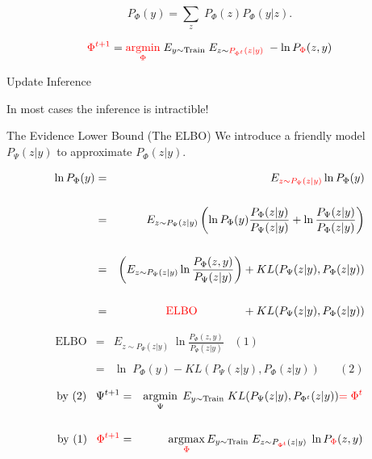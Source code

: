 {

{\color{red} $$P_\Phi(y) = \sum_z\;P_\Phi(z)P_\Phi(y|z).$$}

$${\color{red} \Phi^{t+1}} =  {\color{red} \operatorname*{argmin}_\Phi}\;E_{y \sim \mathrm{Train}} \;E_{z \sim {\color{red} P_{\Phi^t}(z|y)}}\; - \ln P_{\color{red} \Phi}(z,y)$$
\centerline{\hspace{1em} Update \hspace{6em} Inference \hspace{2.5em}~}

\vfill
{\color{red} In most cases the inference is intractible!}

{The Evidence Lower Bound (The ELBO)}
We introduce a friendly model {\color{red} $P_\Psi(z|y)$} to approximate {\color{red} $P_\Phi(z|y)$}.

{\huge
\begin{eqnarray*}
        \ln P_\Phi(y) & = & E_{\color{red} z \sim P_\Psi(z|y)} \ln P_\Phi(y) \\
\\
 & = & E_{z \sim P_\Psi(z|y)} \left(\ln P_\Phi(y)\frac{P_\Phi(z|y)}{P_\Psi(z|y)} + \ln \frac{P_\Psi(z|y)}{P_\Phi(z|y)}\right) \\
 \\
  & = & \left(E_{z \sim P_\Psi(z|y)} \ln \frac{P_\Phi(z,y)}{P_\Psi(z|y)}\right) + KL(P_\Psi(z|y),P_\Phi(z|y)) \\
  \\
  & = & \hspace{4em} \mathrm{\color{red} ELBO} \hspace{4em}  + KL(P_\Psi(z|y),P_\Phi(z|y))
\end{eqnarray*}
}

\begin{eqnarray*}
\mathrm{ELBO} & = & E_{z \sim P_\Psi(z|y)}\; \ln \frac{P_\Phi(z,y)}{P_\Psi(z|y)}\;\;\;(1) \\
 \\      
  & = &\ln\;P_{\Phi}(y) - KL(P_\Psi(z|y),P_{\Phi}(z|y))\;\;\;\;\;\;(2)
  \end{eqnarray*}

\vfill
\begin{eqnarray*}
\mbox{by (2)}\;\;\;\Psi^{t+1} & = & \operatorname*{argmin}_\Psi \;E_{y \sim \mathrm{Train}} \; KL(P_{\Psi}(z|y),P_{\Phi^t}(z|y)) {\color{red} = \Phi^t} \\
\\
\mbox{by (1)}\;\;\;{\color{red} \Phi^{t+1}} & = & \operatorname*{argmax}_{\color{red} \Phi} E_{y \sim \mathrm{Train}} \;E_{z \sim P_{\color{red} {\Phi^t}}(z|y)}\; \ln P_{\color{red} \Phi}(z,y)
\end{eqnarray*}

}
